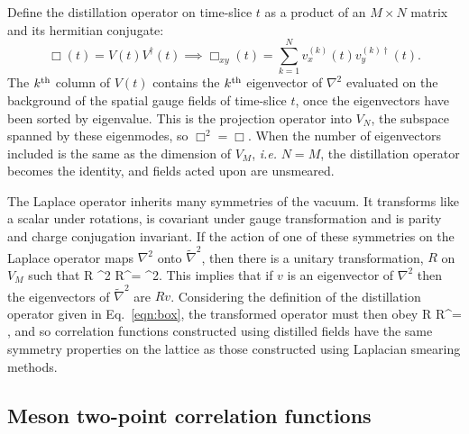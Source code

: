 Define the distillation operator on time-slice $t$ as a product of an $M \times
N$ matrix and its hermitian conjugate:
\begin{equation}
 \Box(t) = V(t) V^\dagger(t)
\implies \Box_{xy}(t) = \sum_{k=1}^N v_x^{(k)} (t) v_y^{(k)\dag} (t).
    \label{eqn:box}
\end{equation}
The $k^{\rm th}$ column of $V(t)$ contains the $k^{\rm th}$ eigenvector
of $\nabla^2$ evaluated on the background of the spatial gauge fields of
time-slice $t$, once the eigenvectors have been sorted by eigenvalue. This is
the projection operator into $V_N$, the subspace spanned by these eigenmodes,
so $\Box^2 = \Box$.
When the number of eigenvectors included is the same as the dimension of
$V_M$, {\em i.e.} $N = M$, the distillation operator becomes the identity, and
fields acted upon are unsmeared.

The Laplace operator inherits many symmetries of the vacuum. It transforms
like a scalar under rotations, is covariant under gauge transformation and
is parity and charge conjugation invariant. If the action of one of these
symmetries on the Laplace operator maps $\nabla^2 $ onto $\tilde\nabla^2$, then
there is a unitary transformation, $R$ on $V_M$ such that
\beq
R \tilde\nabla^2 R^\dagger = \nabla^2.
\eeq
This implies that if $v$ is an eigenvector of $\nabla^2$ then the eigenvectors
of $\tilde\nabla^2$ are $R v$.
Considering the definition of the distillation operator given in
Eq.~\ref{eqn:box}, the transformed operator must then obey
\beq
R \stackrel{\sim}{\Box} R^\dagger = \Box,
\eeq
and so correlation functions constructed using distilled fields have the same
symmetry properties on the lattice as those constructed using Laplacian smearing
methods.

\subsection{Meson two-point correlation functions}\label{subsec:theory-mesons}


